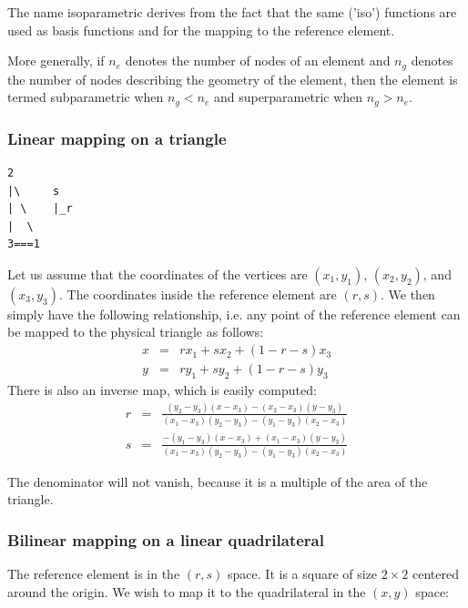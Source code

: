 
The name isoparametric derives from the fact that the same ('iso') 
functions are used as basis functions and for the mapping to the reference element.

More generally, if $n_e$ denotes the number of nodes of an element and $n_g$ denotes the 
number of nodes describing the geometry of the element, 
then the element is termed subparametric when $n_g<n_e$ and 
superparametric when $n_g>n_e$.
 

\subsubsection{Linear mapping on a triangle}

\begin{verbatim}
2
|\     s
| \    |_r
|  \
3===1
\end{verbatim}

Let us assume that the coordinates of the vertices are 
$(x_1,y_1)$,  
$(x_2,y_2)$, and 
$(x_3,y_3)$.
The coordinates inside the reference element are $(r,s)$. We then simply have the 
following relationship, i.e. any point of the reference element 
can be mapped to the physical triangle as follows:
\begin{eqnarray}
x&=& r x_1 + s x_2 + (1-r-s) x_3 \\
y&=& r y_1 + s y_2 + (1-r-s) y_3 
\end{eqnarray} 
There is also an inverse map, which is easily computed:
\begin{eqnarray}
r&=& \frac{(y_2-y_3)(x-x_3)-(x_2-x_3)(y-y_3)}{(x_1-x_3)(y_2-y_3)-(y_1-y_3)(x_2-x_3)} \\
s&=& \frac{-(y_1-y_3)(x-x_3)+(x_1-x_3)(y-y_3)}{(x_1-x_3)(y_2-y_3)-(y_1-y_3)(x_2-x_3)} 
\end{eqnarray} 
\begin{remark}
The denominator will not vanish, because it is a multiple of the area of the triangle.
\end{remark}

\subsubsection{Bilinear mapping on a linear quadrilateral}

The  reference element 
is in the $(r,s)$ space. It is a square of size $2\times2$ 
centered around the origin. We wish to map it to the quadrilateral in the $(x,y)$ space:

